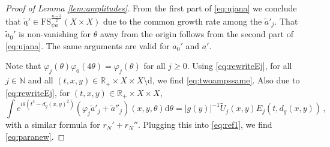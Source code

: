 \documentclass[
	fontsize=11pt, 
	twoside=false, 
	abstract=true, 
	a4paper,
]{scrartcl}
\newcommand{\RR}{\mathbb{R}}
\newcommand{\dd}{\mathrm{d}}
\newcommand{\abs}[1]{\left\lvert#1\right\rvert}
\newcommand{\td}[1]{\tilde{#1}}
\newcommand{\ud}[1]{\underline{#1}}
\begin{document}
\begin{proof}[Proof of Lemma \ref{lem:amplitudes}]
	From the first part of \cref{eq:ujana} we conclude that $\ud{\td{a}'} \in \mathrm{FS}_{\psi a}^{\frac{n-3}{2}}(X\times X)$ due to the common growth rate among the $\td{a}'_j$. That $\td{a}_0'$ is non-vanishing for $\theta$ away from the origin follows from the second part of \cref{eq:ujana}. The same arguments are valid for $a_0'$ and $\ud{a'}$.

	Note that $\varphi_j(\theta)\varphi_0(4\theta) = \varphi_j(\theta)$ for all $j\geq 0$. Using \cref{eq:rewriteEj}, for all $j\in\mathbb{N}$ and all $(t,x,y) \in \RR_+\times X\times X\setminus \dd$, we find \cref{eq:twoampssame}. Also due to \cref{eq:rewriteEj}, for $(t,x,y) \in \RR_+\times X\times X$, 
	\[ 
		\int e^{i\theta(t^2-d_g(x,y)^2)} (\varphi_j\td{a}'_j+\td{a}''_j)(x,y,\theta)\dd\theta = \abs{g(y)}^{-1}\td{U}_j(x,y)E_j(t,d_g(x,y))\,,
	\]
	with a similar formula for $r_N'+r_N''$. Plugging this into \cref{eq:ref1}, we find \cref{eq:paranew}.

\end{proof}
\end{document}
